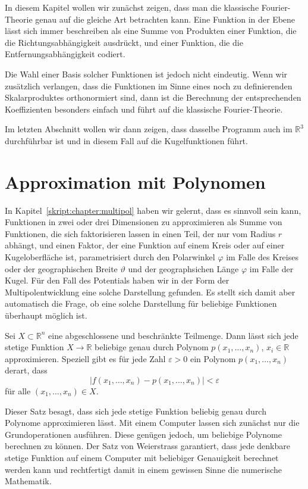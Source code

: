 In diesem Kapitel wollen wir zunächst zeigen, dass man die klassische
Fourier-Theorie genau auf die gleiche Art betrachten kann.
Eine Funktion in der Ebene lässt sich immer beschreiben als eine Summe
von Produkten einer Funktion, die die Richtungsabhängigkeit ausdrückt,
und einer Funktion, die die Entfernungsabhängigkeit codiert.

Die Wahl einer Basis solcher Funktionen ist jedoch nicht eindeutig.
Wenn wir zusätzlich verlangen, dass die Funktionen im Sinne eines noch
zu definierenden Skalarproduktes orthonormiert sind, dann ist die
Berechnung der entsprechenden Koeffizienten besonders einfach und
führt auf die klassische Fourier-Theorie.

Im letzten Abschnitt wollen wir dann zeigen, dass dasselbe Programm
auch im $\mathbb R^3$ durchführbar ist und in diesem Fall auf die
Kugelfunktionen führt.

\section{Approximation mit Polynomen
\label{skript:section:approximation}}
In Kapitel~\ref{skript:chapter:multipol} haben wir gelernt, dass es
sinnvoll sein kann, Funktionen in zwei oder drei Dimensionen zu 
approximieren als Summe von Funktionen, die sich faktorisieren lassen
in einen Teil, der nur vom Radius $r$ abhängt, und einen Faktor,
der eine Funktion auf einem Kreis oder auf einer Kugeloberfläche
ist, parametrisiert durch den Polarwinkel $\varphi$ im Falle des
Kreises oder der geographischen Breite $\vartheta$ und der geographsichen
Länge $\varphi$ im Falle der Kugel.
Für den Fall des Potentials haben wir in der Form der Multipolentwicklung
eine solche Darstellung gefunden.
Es stellt sich damit aber automatisch die Frage, ob eine solche
Darstellung für beliebige Funktionen überhaupt möglich ist.

\begin{satz}[Weierstrass]
\label{skript:satz:weierstrass}
Sei $X\subset\mathbb R^n$ eine abgeschlossene und beschränkte Teilmenge.
Dann lässt sich jede stetige Funktion $X\to\mathbb R$ beliebige genau durch
Polynom $p(x_1,\dots,x_n)$, $x_i\in\mathbb R$
approximieren.
Speziell gibt es für jede Zahl $\varepsilon>0$ ein Polynom $p(x_1,\dots,x_n)$
derart, dass
\[
|f(x_1,\dots,x_n)- p(x_1,\dots,x_n)|<\varepsilon
\]
für alle $(x_1,\dots,x_n)\in X$.
\end{satz}
%

Dieser Satz besagt, dass sich jede stetige Funktion beliebig genau durch
Polynome approximieren lässt. 
Mit einem Computer lassen sich zunächst nur die Grundoperationen ausführen.
Diese genügen jedoch, um beliebige Polynome berechnen zu können.
Der Satz von Weierstrass garantiert, dass jede denkbare stetige Funktion
auf einem Computer mit beliebiger Genauigkeit berechnet werden kann
und rechtfertigt damit in einem gewissen Sinne die numerische Mathematik.

